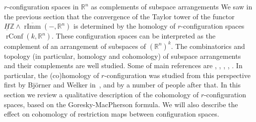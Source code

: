 \documentclass[12pt]{amsart}
\newcommand{\R}{{\mathbb R}}
\newcommand{\Z}{{\mathbb Z}}
\newcommand{\rImm}{\operatorname{rImm}}
\newcommand{\rbar}{\overline{\rImm}}
\newcommand{\rConf}{\operatorname{rConf}}
\newcommand{\HZ}{\underline{H}\Z}
\theoremstyle{plain}
\theoremstyle{definition}
\theoremstyle{remark}
\begin{document}
\begin{section}{$r$-configuration spaces in $\mathbb R^n$ as complements of subspace arrangements}\label{S:GM}
We saw in the previous section that the convergence of the Taylor tower of the functor $\HZ \wedge \rbar(-, \R^n)$ is determined by the homology of $r$-configuration spaces $\rConf(k, \R^n)$. These configuration spaces can be interpreted as the complement of an arrangement of subspaces of $(\R^n)^k$. The combinatorics and topology (in particular, homology and cohomology) of subspace arrangements and their complements are well studied. 
Some of main references are \cite{Orlik1980}, \cite{Goresky1980}, \cite{Goresky1983}, \cite{GM1983}, \cite{Bjorner1990}. In particular, the (co)homology of $r$-configuration was studied from this perspective first by Bj\"orner and Welker in~\cite{Bjo95}, and by a number of people after that. In this section we review a qualitative description of the cohomology of $r$-configuration spaces, based on the Goresky-MacPherson formula. We will also describe the effect on cohomology of restriction maps between configuration spaces.


\end{section}
\end{document}
